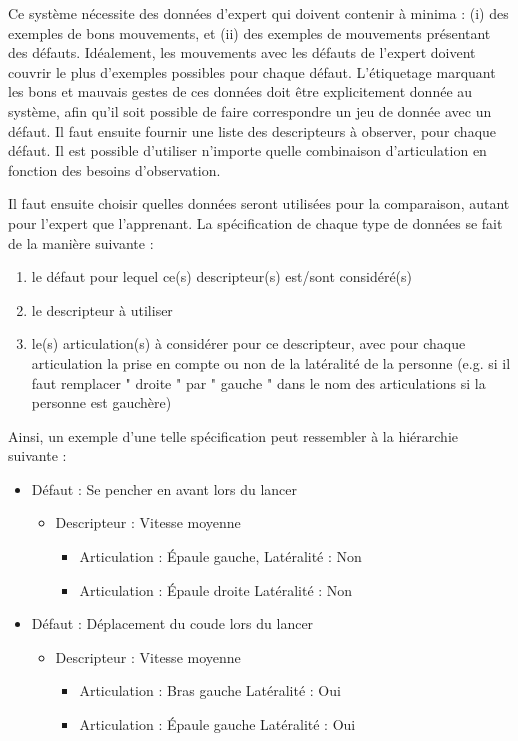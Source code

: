 Ce système nécessite des données d'expert qui doivent contenir à minima : (i) des exemples de bons mouvements, et (ii) des exemples de mouvements présentant des défauts. Idéalement, les mouvements avec les défauts de l'expert doivent couvrir le plus d'exemples possibles pour chaque défaut. L'étiquetage marquant les bons et mauvais gestes de ces données doit être explicitement donnée au système, afin qu'il soit possible de faire correspondre un jeu de donnée avec un défaut. Il faut ensuite fournir une liste des descripteurs à observer, pour chaque défaut. Il est possible d'utiliser n'importe quelle combinaison d'articulation en fonction des besoins d'observation.

Il faut ensuite choisir quelles données seront utilisées pour la comparaison, autant pour l'expert que l'apprenant. La spécification de chaque type de données se fait de la manière suivante :
\begin{enumerate}
	\item le défaut pour lequel ce(s) descripteur(s) est/sont considéré(s)
	\item le descripteur à utiliser
	\item le(s) articulation(s) à considérer pour ce descripteur, avec pour chaque articulation la prise en compte ou non de la latéralité de la personne (e.g. si il faut remplacer " droite " par " gauche " dans le nom des articulations si la personne est gauchère)
\end{enumerate}

Ainsi, un exemple d'une telle spécification peut ressembler à la hiérarchie suivante :
\begin{itemize}[label=\textbullet]
	\item Défaut : Se pencher en avant lors du lancer
	\begin{itemize}[label=\textbullet]
		\item Descripteur : Vitesse moyenne
		\begin{itemize}
			\item Articulation : Épaule gauche, Latéralité : Non
		\end{itemize}
		\begin{itemize}
			\item Articulation : Épaule droite Latéralité : Non
		\end{itemize}
	\end{itemize}

	\item Défaut : Déplacement du coude lors du lancer
	\begin{itemize}[label=\textbullet]
		\item Descripteur : Vitesse moyenne
		\begin{itemize}
			\item Articulation : Bras gauche Latéralité : Oui
		\end{itemize}
		\begin{itemize}
			\item Articulation : Épaule gauche Latéralité : Oui
		\end{itemize}
	\end{itemize}
\end{itemize}

